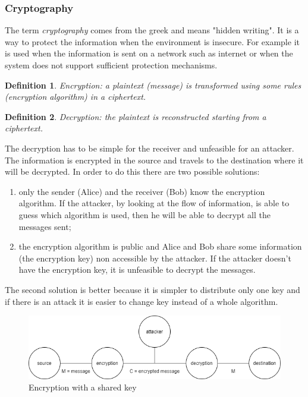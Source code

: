 \documentclass[a4paper, 12pt]{report}
\newtheorem{definition}{\textbf{Definition}}
\begin{document}
\subsubsection{Cryptography}
The term \textit{cryptography} comes from the greek and means "hidden writing". It is a way to protect the information when the environment is insecure.
For example it is used when the information is sent on a network such as internet or when the system does not support sufficient protection mechanisms.

\begin{definition}
	Encryption: a \textit{plaintext} (message) is transformed using some rules (encryption algorithm) in a ciphertext.
\end{definition}

\begin{definition}
	Decryption: the plaintext is reconstructed starting from a ciphertext.
\end{definition}

The decryption has to be simple for the receiver and unfeasible for an attacker.
The information is encrypted in the source and travels to the destination where it will be decrypted.
In order to do this there are two possible solutions:
\begin{enumerate}
	\item only the sender (Alice) and the receiver (Bob) know the encryption algorithm. If the attacker, by looking at the flow of information, is able to guess which algorithm is used, then he will be able to decrypt all the messages sent;
	\item the encryption algorithm is public and Alice and Bob share some information (the encryption key) non accessible by the attacker. If the attacker doesn't have the encryption key, it is unfeasible to decrypt the messages.
\end{enumerate}

The second solution is better because it is simpler to distribute only one key and if there is an attack it is easier to change key instead of a whole algorithm.

\begin{figure}[H]
	\centering
	\includegraphics[scale=0.6]{images/enc1.png}
	\caption{Encryption with a shared key}
	\label{fig:enc1}
\end{figure}
\end{document}
